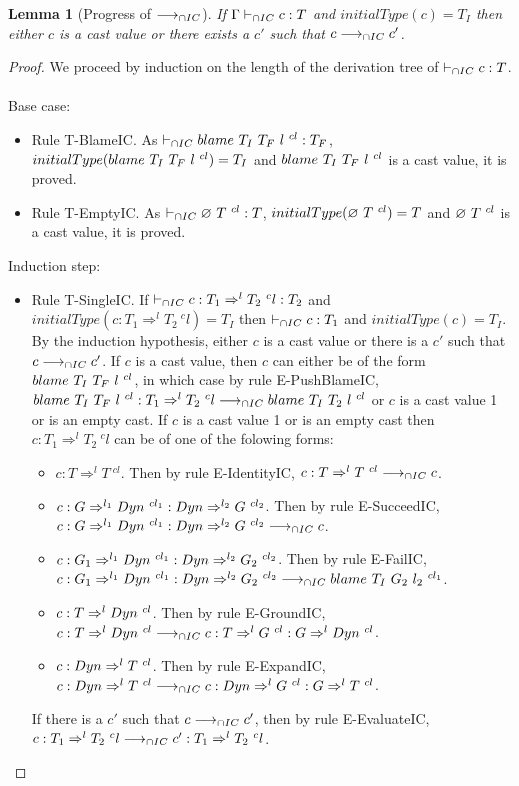 \documentclass[a4paper]{article}
\newtheorem{lemma}{Lemma}
\begin{document}
\begin{lemma}[Progress of $\longrightarrow_{\cap IC}$]
\label{progressIC}
If $\Gamma \vdash_{\cap IC} c : T$ and $initialType(c) = T_I$ then either $c$ is a cast value or there exists a $c'$ such that $c \longrightarrow_{\cap IC} c'$.
\end{lemma}
\begin{proof}
We proceed by induction on the length of the derivation tree of $\vdash_{\cap IC} c : T$.\\\\
Base case:
\begin{itemize}
    \item Rule T-BlameIC.
    As $\vdash_{\cap IC} blame\ T_I\ T_F\ l\ ^{cl} : T_F$, $initialType(blame\ T_I\ T_F\ l\ ^{cl}) = T_I$ and $blame\ T_I\ T_F\ l\ ^{cl}$ is a cast value, it is proved.
    \item Rule T-EmptyIC.
    As $\vdash_{\cap IC} \varnothing\ T\ ^{cl} : T$, $initialType(\varnothing\ T\ ^{cl}) = T$ and $\varnothing\ T\ ^{cl}$ is a cast value, it is proved.
\end{itemize}
Induction step:
\begin{itemize}
    \item Rule T-SingleIC.
    If $\vdash_{\cap IC} c : T_1 \Rightarrow^l T_2\ ^cl : T_2$ and $initialType(c : T_1 \Rightarrow^l T_2\ ^cl) = T_I$ then $\vdash_{\cap IC} c : T_1$ and $initialType(c) = T_I$.
    By the induction hypothesis, either $c$ is a cast value or there is a $c'$ such that $c \longrightarrow_{\cap IC} c'$.
    If $c$ is a cast value, then $c$ can either be of the form $blame\ T_I\ T_F\ l\ ^{cl}$, in which case by rule E-PushBlameIC, $blame\ T_I\ T_F\ l\ ^{cl} : T_1 \Rightarrow^l T_2\ ^cl \longrightarrow_{\cap IC} blame\ T_I\ T_2\ l\ ^{cl}$ or $c$ is a cast value 1 or is an empty cast.
    If $c$ is a cast value 1 or is an empty cast then $c : T_1 \Rightarrow^l T_2\ ^cl$ can be of one of the folowing forms:
    \begin{itemize}
        \item $c : T \Rightarrow^l T\ ^{cl}$. Then by rule E-IdentityIC, $c : T \Rightarrow^l T\ ^{cl} \longrightarrow_{\cap IC} c$.
        \item $c : G \Rightarrow^{l_1} Dyn\ ^{cl_1} : Dyn \Rightarrow^{l_2} G\ ^{cl_2}$. Then by rule E-SucceedIC, $c : G \Rightarrow^{l_1} Dyn\ ^{cl_1} : Dyn \Rightarrow^{l_2} G\ ^{cl_2} \longrightarrow_{\cap IC} c$.
        \item $c : G_1 \Rightarrow^{l_1} \Dyn\ ^{cl_1} : \Dyn \Rightarrow^{l_2} G_2\ ^{cl_2}$. Then by rule E-FailIC, $c : G_1 \Rightarrow^{l_1} \Dyn\ ^{cl_1} : \Dyn \Rightarrow^{l_2} G_2\ ^{cl_2} \icos \blamecast{T_I}{G_2}{l_2}{cl_1}$.
        \item $c : T \Rightarrow^l \Dyn\ ^{cl}$. Then by rule E-GroundIC, $c : T \Rightarrow^l Dyn\ ^{cl} \longrightarrow_{\cap IC} c : T \Rightarrow^l G\ ^{cl} : G \Rightarrow^l Dyn\ ^{cl}$.
        \item $c : \Dyn \Rightarrow^l T\ ^{cl}$. Then by rule E-ExpandIC, $c : Dyn \Rightarrow^l T\ ^{cl} \longrightarrow_{\cap IC} c : Dyn \Rightarrow^l G\ ^{cl} : G \Rightarrow^l T\ ^{cl}$.
    \end{itemize}
    If there is a $c'$ such that $c \longrightarrow_{\cap IC} c'$, then by rule E-EvaluateIC, $c : T_1 \Rightarrow^l T_2\ ^cl \longrightarrow_{\cap IC} c' : T_1 \Rightarrow^l T_2\ ^cl$.
\end{itemize}
\end{proof}
\end{document}
